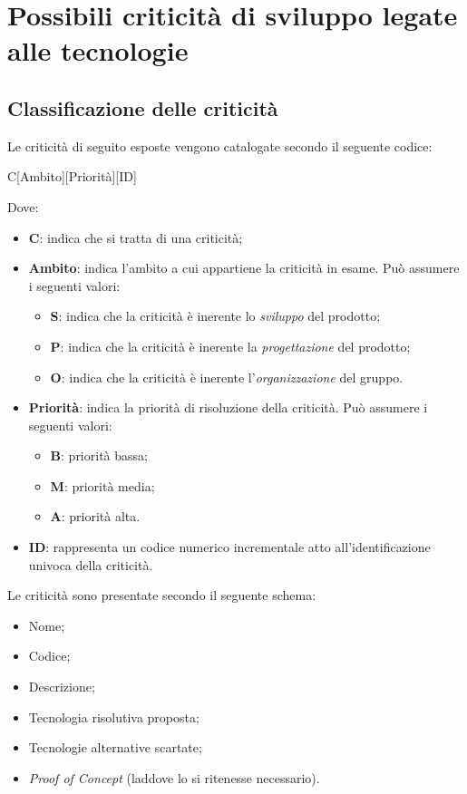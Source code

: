 \documentclass[./../Technology Baseline.tex]{subfiles}
\begin{document}
	
\chapter{Possibili criticità di sviluppo legate alle tecnologie}

\section{Classificazione delle criticità}

Le criticità di seguito esposte vengono catalogate secondo il seguente codice:

\begin{center}
	C[Ambito][Priorità][ID]
\end{center}

Dove:

\begin{itemize}
	\item \textbf{C}: indica che si tratta di una criticità;
	\item \textbf{Ambito}: indica l'ambito a cui appartiene la criticità in esame. Può assumere i seguenti valori:
	\begin{itemize}
		\item \textbf{S}: indica che la criticità è inerente lo \textit{sviluppo} del prodotto;
		\item \textbf{P}: indica che la criticità è inerente la \textit{progettazione} del prodotto;
		\item \textbf{O}: indica che la criticità è inerente l'\textit{organizzazione} del gruppo.
	\end{itemize}
	\item \textbf{Priorità}: indica la priorità di risoluzione della criticità. Può assumere i seguenti valori:
	\begin{itemize}
		\item \textbf{B}: priorità bassa;
		\item \textbf{M}: priorità media;
		\item \textbf{A}: priorità alta.
	\end{itemize}
	\item \textbf{ID}: rappresenta un codice numerico incrementale atto all'identificazione univoca della criticità.
\end{itemize}

\noindent Le criticità sono presentate secondo il seguente schema: 

\begin{itemize}
	\item Nome;
	\item Codice;
	\item Descrizione;
	\item Tecnologia risolutiva proposta;
	\item Tecnologie alternative scartate;
	\item \textit{Proof of Concept} (laddove lo si ritenesse necessario).
\end{itemize}
\end{document}
